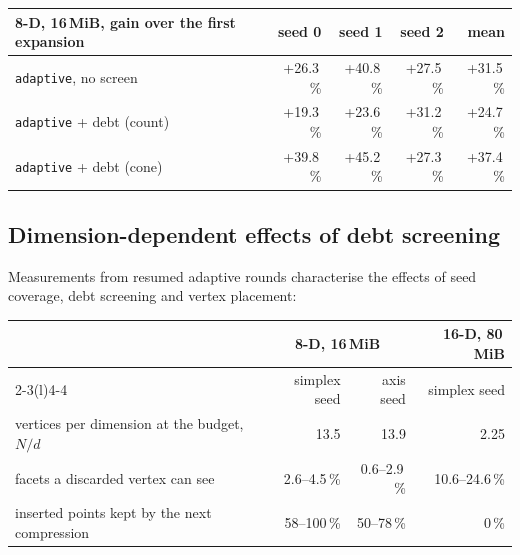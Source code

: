 \documentclass[11pt,a4paper]{report}
\newcommand{\code}[1]{\texttt{\small #1}}
\begin{document}
\begin{center}\small
\begin{tabular}{@{}lrrrr@{}}
\toprule
8-D, 16\,MiB, gain over the first expansion & seed 0 & seed 1 & seed 2 & mean \\
\midrule
\code{adaptive}, no screen         & +26.3\,\% & +40.8\,\% & +27.5\,\% & +31.5\,\% \\
\code{adaptive} + debt (count)     & +19.3\,\% & +23.6\,\% & +31.2\,\% & +24.7\,\% \\
\code{adaptive} + debt (cone)      & +39.8\,\% & +45.2\,\% & +27.3\,\% & +37.4\,\% \\
\bottomrule
\end{tabular}
\end{center}

\subsection{Dimension-dependent effects of debt screening}
\label{sec:debtfade}

Measurements from resumed adaptive rounds characterise the effects of seed
coverage, debt screening and vertex placement:

\begin{center}\small
\begin{tabular}{@{}lrrr@{}}
\toprule
& \multicolumn{2}{c}{8-D, 16\,MiB} & 16-D, 80\,MiB \\
\cmidrule(lr){2-3}\cmidrule(l){4-4}
& simplex seed & axis seed & simplex seed \\
\midrule
vertices per dimension at the budget, $N/d$      & 13.5         & 13.9        & 2.25 \\
facets a discarded vertex can see               & 2.6--4.5\,\% & 0.6--2.9\,\% & 10.6--24.6\,\% \\
inserted points kept by the next compression    & 58--100\,\%  & 50--78\,\%  & 0\,\% \\
\bottomrule
\end{tabular}
\end{center}
\end{document}
